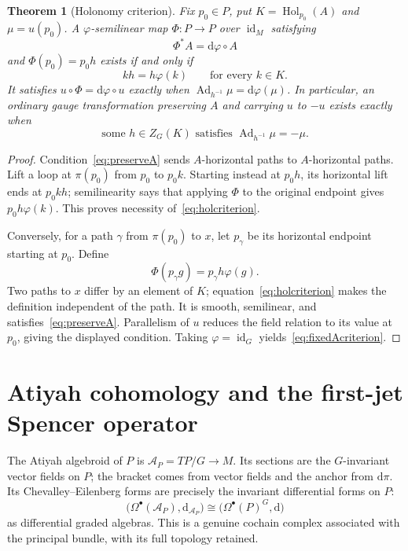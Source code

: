 \documentclass[11pt]{amsart}
\newcommand{\Ad}{\operatorname{Ad}}
\newcommand{\Hol}{\operatorname{Hol}}
\newcommand{\dd}{\mathrm d}
\newcommand{\id}{\operatorname{id}}
\theoremstyle{plain}
\newtheorem{theorem}{Theorem}[section]
\theoremstyle{definition}
\theoremstyle{remark}
\begin{document}
\begin{theorem}[Holonomy criterion]\label{thm:holonomy}
Fix $p_0\in P$, put $K=\Hol_{p_0}(A)$ and $\mu=u(p_0)$.  A $\varphi$-semilinear map $\Phi:P\to P$ over $\id_M$ satisfying
\begin{equation}\label{eq:preserveA}
 \Phi^*A=\dd\varphi\circ A
\end{equation}
and $\Phi(p_0)=p_0h$ exists if and only if
\begin{equation}\label{eq:holcriterion}
 kh=h\varphi(k)\qquad\text{for every }k\in K.
\end{equation}
It satisfies $u\circ\Phi=\dd\varphi\circ u$ exactly when $\Ad_{h^{-1}}\mu=\dd\varphi(\mu)$.  In particular, an ordinary gauge transformation preserving $A$ and carrying $u$ to $-u$ exists exactly when
\begin{equation}\label{eq:fixedAcriterion}
 \text{some }h\in Z_G(K)\text{ satisfies }\Ad_{h^{-1}}\mu=-\mu.
\end{equation}
\end{theorem}

\begin{proof}
Condition~\eqref{eq:preserveA} sends $A$-horizontal paths to $A$-horizontal paths.  Lift a loop at $\pi(p_0)$ from $p_0$ to $p_0k$.  Starting instead at $p_0h$, its horizontal lift ends at $p_0kh$; semilinearity says that applying $\Phi$ to the original endpoint gives $p_0h\varphi(k)$.  This proves necessity of~\eqref{eq:holcriterion}.

Conversely, for a path $\gamma$ from $\pi(p_0)$ to $x$, let $p_\gamma$ be its horizontal endpoint starting at $p_0$.  Define
\[
 \Phi(p_\gamma g)=p_\gamma h\varphi(g).
\]
Two paths to $x$ differ by an element of $K$; equation~\eqref{eq:holcriterion} makes the definition independent of the path.  It is smooth, semilinear, and satisfies~\eqref{eq:preserveA}.  Parallelism of $u$ reduces the field relation to its value at $p_0$, giving the displayed condition.  Taking $\varphi=\id_G$ yields~\eqref{eq:fixedAcriterion}.
\end{proof}

\section{Atiyah cohomology and the first-jet Spencer operator}\label{sec:cohomology}

The Atiyah algebroid of $P$ is $\mathcal A_P=TP/G\to M$.  Its sections are the $G$-invariant vector fields on $P$; the bracket comes from vector fields and the anchor from $\dd\pi$.  Its Chevalley--Eilenberg forms are precisely the invariant differential forms on $P$:
\begin{equation}\label{eq:AtiyahDGA}
 \bigl(\Omega^\bullet(\mathcal A_P),\dd_{\mathcal A_P}\bigr)
 \cong\bigl(\Omega^\bullet(P)^G,\dd\bigr)
\end{equation}
as differential graded algebras.  This is a genuine cochain complex associated with the principal bundle, with its full topology retained.
\end{document}

